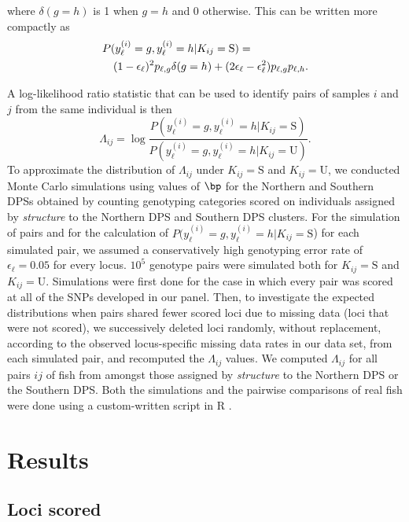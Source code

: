 where $\delta(g = h)$ is 1 when $g=h$ and 0 otherwise.  This can be written more compactly as
\begin{eqnarray}
\lefteqn{P(y^{(i)}_\ell = g, y^{(i)}_\ell = h | K_{ij} = \mathrm{S})  =} \\ \nonumber
& & (1-\epsilon_\ell)^2  p_{\ell,g}  \delta(g = h) + (2\epsilon_\ell - \epsilon_\ell^2) p_{\ell,g} p_{\ell,h}. \label{eq:pairS}
\end{eqnarray}

A log-likelihood ratio statistic that can be used to
identify pairs of samples $i$ and $j$ from the same
individual is then
\begin{equation}
\Lambda_{ij}= \log\frac{P(y^{(i)}_\ell = g, y^{(i)}_\ell = h | K_{ij} = \mathrm{S})}
{P(y^{(i)}_\ell = g, y^{(i)}_\ell = h | K_{ij} = \mathrm{U})}.
\label{eq:logl}
\end{equation}
To approximate the distribution of
$\Lambda_{ij}$ under $K_{ij} = \mathrm{S}$ and $K_{ij} = \mathrm{U}$, we
conducted Monte Carlo simulations using values of $\bp$ for the Northern and Southern DPSs obtained
by counting genotyping categories scored on individuals assigned by {\em structure} to
the Northern DPS and Southern DPS
clusters.  For the simulation of pairs and for the calculation
of $P(y^{(i)}_\ell = g, y^{(i)}_\ell = h | K_{ij} = \mathrm{S}$) 
for each simulated pair, we assumed a conservatively high genotyping error rate of
$\epsilon_\ell = 0.05$ for every locus.  
$10^5$ genotype pairs were simulated both for $K_{ij} = \mathrm{S}$ and $K_{ij} = \mathrm{U}$.
Simulations were first done for 
the case in which every pair was scored at all of the SNPs developed in our
panel. Then, to investigate the expected
distributions when pairs shared fewer scored loci due to missing data (\ie loci that were not scored),
we successively deleted loci randomly, without replacement, according to 
the observed locus-specific missing
data rates in our data set, from each simulated pair, and recomputed the $\Lambda_{ij}$ values.
We computed $\Lambda_{ij}$ for all pairs
$ij$ of fish from amongst those assigned by {\em structure} to the
Northern DPS or the Southern DPS\@. Both the
simulations and the pairwise comparisons of real fish were done using a custom-written
script in R \citep{RCore2015}.

\section{Results}

\subsection{Loci scored}

